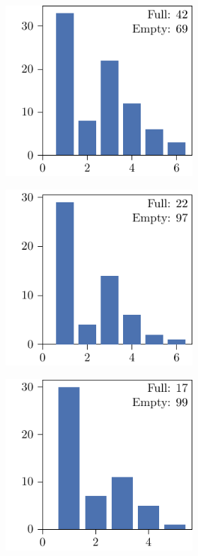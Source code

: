 \newlength{\mymultiinner}
\setlength{\mymultiinner}{.3\textwidth}
\newlength{\mymultiouter}
\setlength{\mymultiouter}{.3\textwidth}

\begin{figure}[p]
  \centering
  \begin{subfigure}{\textwidth}
    \centering
    \begin{subfigure}{\mymultiouter}
        \includegraphics[width=\mymultiinner]{figures/new/abs_common-diabetes-qlibra-permutation}
    \end{subfigure}
    \begin{subfigure}{\mymultiouter}
        \includegraphics[width=\mymultiinner]{figures/new/abs_common-diabetes-qlibra-retraining}
    \end{subfigure}
    \begin{subfigure}{\mymultiouter}
        \includegraphics[width=\mymultiinner]{figures/new/abs_common-diabetes-permutation-retraining}

\end{subfigure}
\end{subfigure}
\end{figure}
